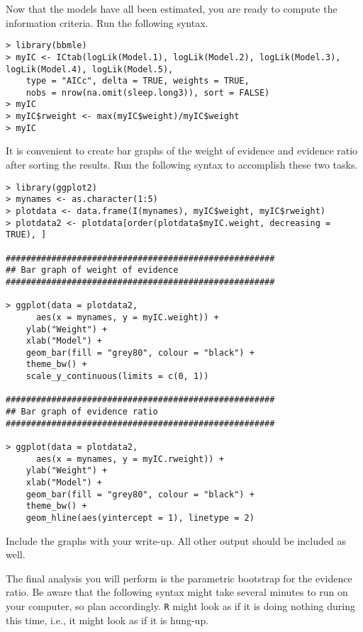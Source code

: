 \documentclass[]{article}
\begin{document}
\pagebreak
\noindent Now that the models have all been estimated, you are ready to compute the information criteria. Run the following syntax.

\begin{shaded}
\begin{lstlisting}
> library(bbmle)
> myIC <- ICtab(logLik(Model.1), logLik(Model.2), logLik(Model.3), logLik(Model.4), logLik(Model.5), 
    type = "AICc", delta = TRUE, weights = TRUE, 
    nobs = nrow(na.omit(sleep.long3)), sort = FALSE)
> myIC
> myIC$rweight <- max(myIC$weight)/myIC$weight
> myIC
\end{lstlisting}
\end{shaded}

\noindent It is convenient to create bar graphs of the weight of evidence and evidence ratio after sorting the
results. Run the following syntax to accomplish these two tasks.

\begin{shaded}
\begin{lstlisting}
> library(ggplot2)
> mynames <- as.character(1:5)
> plotdata <- data.frame(I(mynames), myIC$weight, myIC$rweight)
> plotdata2 <- plotdata[order(plotdata$myIC.weight, decreasing = TRUE), ]

#####################################################
## Bar graph of weight of evidence
#####################################################
 
> ggplot(data = plotdata2, 
      aes(x = mynames, y = myIC.weight)) + 
    ylab("Weight") +
    xlab("Model") +
    geom_bar(fill = "grey80", colour = "black") + 
    theme_bw() + 
    scale_y_continuous(limits = c(0, 1))
 
#####################################################
## Bar graph of evidence ratio
#####################################################

> ggplot(data = plotdata2, 
      aes(x = mynames, y = myIC.rweight)) + 
    ylab("Weight") +
    xlab("Model") +
    geom_bar(fill = "grey80", colour = "black") + 
    theme_bw() + 
    geom_hline(aes(yintercept = 1), linetype = 2)
\end{lstlisting}
\end{shaded}


\noindent Include the graphs with your write-up. All other output should be included as well.\\
\pagebreak

\noindent The final analysis you will perform is the parametric bootstrap for the evidence ratio. Be aware that the following syntax might take several minutes to run on your computer, so plan accordingly. \texttt{R} might look as if it is doing nothing during this time, i.e., it might look as if it is hung-up.
\end{document}
